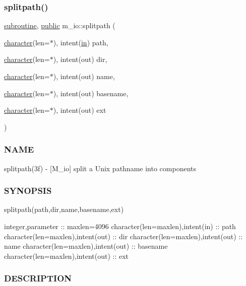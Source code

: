 \subsubsection{\texorpdfstring{splitpath()}{splitpath()}}
{\footnotesize\ttfamily \hyperlink{M__stopwatch_83_8txt_acfbcff50169d691ff02d4a123ed70482}{subroutine}, \hyperlink{M__stopwatch_83_8txt_a2f74811300c361e53b430611a7d1769f}{public} m\+\_\+io\+::splitpath (\begin{DoxyParamCaption}\item[{\hyperlink{option__stopwatch_83_8txt_abd4b21fbbd175834027b5224bfe97e66}{character}(len=$\ast$), intent(\hyperlink{M__journal_83_8txt_afce72651d1eed785a2132bee863b2f38}{in})}]{path,  }\item[{\hyperlink{option__stopwatch_83_8txt_abd4b21fbbd175834027b5224bfe97e66}{character}(len=$\ast$), intent(out)}]{dir,  }\item[{\hyperlink{option__stopwatch_83_8txt_abd4b21fbbd175834027b5224bfe97e66}{character}(len=$\ast$), intent(out)}]{name,  }\item[{\hyperlink{option__stopwatch_83_8txt_abd4b21fbbd175834027b5224bfe97e66}{character}(len=$\ast$), intent(out)}]{basename,  }\item[{\hyperlink{option__stopwatch_83_8txt_abd4b21fbbd175834027b5224bfe97e66}{character}(len=$\ast$), intent(out)}]{ext }\end{DoxyParamCaption})}



\subsubsection*{N\+A\+ME}

splitpath(3f) -\/ \mbox{[}M\+\_\+io\mbox{]} split a Unix pathname into components 

\subsubsection*{S\+Y\+N\+O\+P\+S\+IS}

splitpath(path,dir,name,basename,ext)

integer,parameter \+:\+: maxlen=4096 character(len=maxlen),intent(in) \+:\+: path character(len=maxlen),intent(out) \+:\+: dir character(len=maxlen),intent(out) \+:\+: name character(len=maxlen),intent(out) \+:\+: basename character(len=maxlen),intent(out) \+:\+: ext

\subsubsection*{D\+E\+S\+C\+R\+I\+P\+T\+I\+ON}

